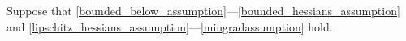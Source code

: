 Suppose that \cref{bounded_below_assumption}---\cref{bounded_hessians_assumption} and \cref{lipschitz_hessians_assumption}---\cref{mingradassumption} hold.
